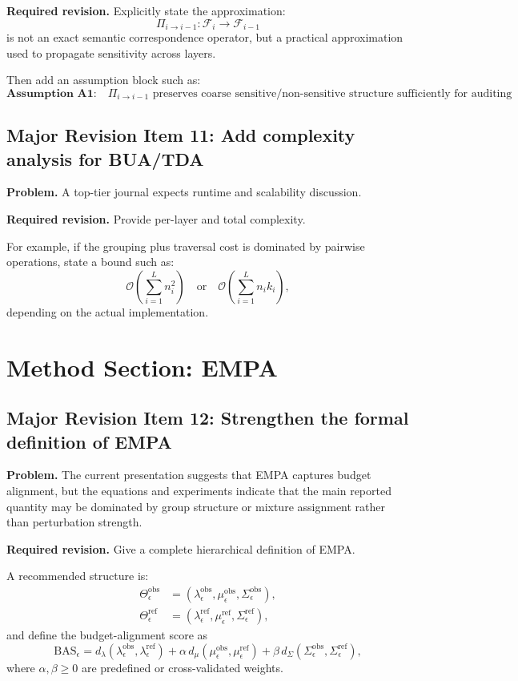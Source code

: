 \textbf{Required revision.}
Explicitly state the approximation:
\[
\Pi_{i \rightarrow i-1}: \mathcal{F}_i \rightarrow \mathcal{F}_{i-1}
\]
is not an exact semantic correspondence operator, but a practical approximation used to propagate sensitivity across layers.

Then add an assumption block such as:
\[
\textbf{Assumption A1:}
\quad
\Pi_{i \rightarrow i-1}
\text{ preserves coarse sensitive/non-sensitive structure sufficiently for auditing purposes.}
\]

\subsection*{Major Revision Item 11: Add complexity analysis for BUA/TDA}
\textbf{Problem.} A top-tier journal expects runtime and scalability discussion.

\textbf{Required revision.}
Provide per-layer and total complexity.

For example, if the grouping plus traversal cost is dominated by pairwise operations, state a bound such as:
\[
\mathcal{O}\!\left(\sum_{i=1}^{L} n_i^2\right)
\quad \text{or} \quad
\mathcal{O}\!\left(\sum_{i=1}^{L} n_i k_i\right),
\]
depending on the actual implementation.

\section{Method Section: EMPA}

\subsection*{Major Revision Item 12: Strengthen the formal definition of EMPA}
\textbf{Problem.} The current presentation suggests that EMPA captures budget alignment, but the equations and experiments indicate that the main reported quantity may be dominated by group structure or mixture assignment rather than perturbation strength.

\textbf{Required revision.}
Give a complete hierarchical definition of EMPA.

A recommended structure is:
\begin{align}
\Theta_{\epsilon}^{\mathrm{obs}}
&=
\left(
\lambda^{\mathrm{obs}}_{\epsilon},
\mu^{\mathrm{obs}}_{\epsilon},
\Sigma^{\mathrm{obs}}_{\epsilon}
\right), \\
\Theta_{\epsilon}^{\mathrm{ref}}
&=
\left(
\lambda^{\mathrm{ref}}_{\epsilon},
\mu^{\mathrm{ref}}_{\epsilon},
\Sigma^{\mathrm{ref}}_{\epsilon}
\right),
\end{align}
and define the budget-alignment score as
\begin{equation}
\mathrm{BAS}_{\epsilon}
=
d_{\lambda}\!\left(
\lambda^{\mathrm{obs}}_{\epsilon},
\lambda^{\mathrm{ref}}_{\epsilon}
\right)
+
\alpha \,
d_{\mu}\!\left(
\mu^{\mathrm{obs}}_{\epsilon},
\mu^{\mathrm{ref}}_{\epsilon}
\right)
+
\beta \,
d_{\Sigma}\!\left(
\Sigma^{\mathrm{obs}}_{\epsilon},
\Sigma^{\mathrm{ref}}_{\epsilon}
\right),
\label{eq:bas_full}
\end{equation}
where $\alpha,\beta \ge 0$ are predefined or cross-validated weights.


